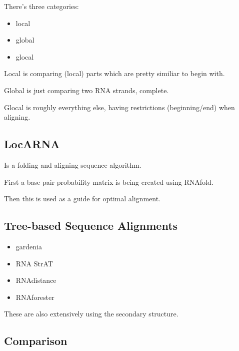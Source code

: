 \documentclass{scrartcl}
\begin{document}
There's three categories:
\begin{itemize}
\item local
\item global 
\item glocal
\end{itemize}

Local is comparing (local) parts which are pretty similiar to begin with.

Global is just comparing two RNA strands, complete.

Glocal is roughly everything else, having restrictions (beginning/end) when aligning.


\subsection*{LocARNA}

Is a folding and aligning sequence algorithm.

First a base pair probability matrix is being created using RNAfold.

Then this is used as a guide for optimal alignment.


\subsection*{Tree-based Sequence Alignments}

\begin{itemize}
\item gardenia
\item RNA StrAT
\item RNAdistance
\item RNAforester
\end{itemize}

These are also extensively using the secondary structure.


\subsection*{Comparison}
\end{document}
